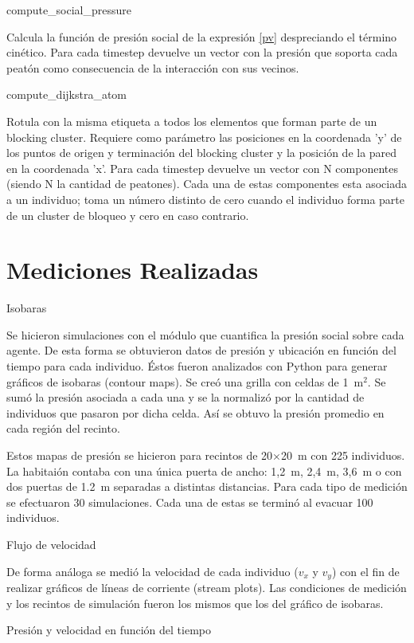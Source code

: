 {\Large compute\_social\_pressure}

Calcula la función de presión social de la expresión \eqref{pv} despreciando el término cinético. Para cada timestep devuelve un vector con la presión que soporta cada peatón como consecuencia de la interacción con sus vecinos. 

{\Large compute\_dijkstra\_atom}

Rotula con la misma etiqueta a todos los elementos que forman parte de un blocking cluster. Requiere como parámetro las posiciones en la coordenada 'y' de los puntos de origen y terminación del blocking cluster y la posición de la pared en la coordenada 'x'. Para cada timestep devuelve un vector con N componentes (siendo N la cantidad de peatones). Cada una de estas componentes esta asociada a un individuo; toma un número distinto de cero cuando el individuo forma parte de un cluster de bloqueo y cero en caso contrario. 

\section{\label{med realizadas} Mediciones Realizadas}

{\Large Isobaras}

Se hicieron simulaciones con el módulo que cuantifica la presión social sobre cada agente. De esta forma se obtuvieron datos de presión y ubicación en función del tiempo para cada individuo. Éstos fueron analizados con Python para generar gráficos de isobaras (contour maps). Se creó una grilla con celdas de 1~m$^2$. Se sumó la presión asociada a cada una y se la normalizó por la cantidad de individuos que pasaron por dicha celda. Así se obtuvo la presión promedio en cada región del recinto.   

Estos mapas de presión se hicieron para recintos de 20$\times$20~m con 225 individuos. La habitaión contaba con una única puerta de ancho: 1,2~m, 2,4~m, 3,6~m o con dos puertas de 1.2~m separadas a distintas distancias. Para cada tipo de medición se efectuaron 30 simulaciones. Cada una de estas se terminó al evacuar 100 individuos. 

{\Large Flujo de velocidad}

De forma análoga se medió la velocidad de cada individuo ($v_x$ y $v_y$) con el fin de realizar gráficos de líneas de corriente (stream plots). Las condiciones de medición y los recintos de simulación fueron los mismos que los del gráfico de isobaras. 

{\Large Presión y velocidad en función del tiempo}


